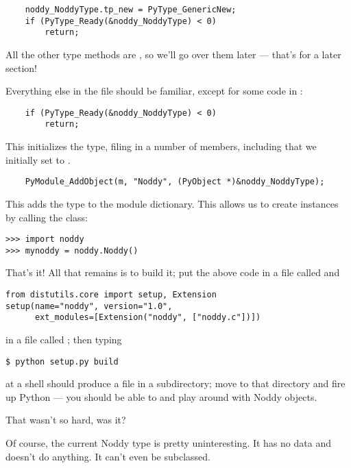 \begin{verbatim}
    noddy_NoddyType.tp_new = PyType_GenericNew;
    if (PyType_Ready(&noddy_NoddyType) < 0)
        return;
\end{verbatim}

All the other type methods are \NULL, so we'll go over them later
--- that's for a later section!

Everything else in the file should be familiar, except for some code
in :

\begin{verbatim}
    if (PyType_Ready(&noddy_NoddyType) < 0)
        return;
\end{verbatim}

This initializes the  type, filing in a number of
members, including  that we initially set to \NULL.

\begin{verbatim}
    PyModule_AddObject(m, "Noddy", (PyObject *)&noddy_NoddyType);
\end{verbatim}

This adds the type to the module dictionary.  This allows us to create
 instances by calling the  class:

\begin{verbatim}
>>> import noddy
>>> mynoddy = noddy.Noddy()
\end{verbatim}

That's it!  All that remains is to build it; put the above code in a
file called  and

\begin{verbatim}
from distutils.core import setup, Extension
setup(name="noddy", version="1.0",
      ext_modules=[Extension("noddy", ["noddy.c"])])
\end{verbatim}

in a file called ; then typing

\begin{verbatim}
$ python setup.py build
\end{verbatim} %

at a shell should produce a file  in a subdirectory;
move to that directory and fire up Python --- you should be able to
 and play around with Noddy objects.

That wasn't so hard, was it?

Of course, the current Noddy type is pretty uninteresting. It has no
data and doesn't do anything. It can't even be subclassed.


